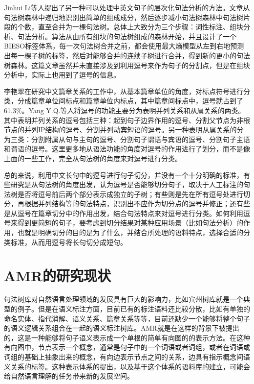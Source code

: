 \documentclass[master, winfont]{njuthesis}
\begin{document}
Jinhui Li等人\cite{Li2008}提出了另一种可以处理中英文句子的层次化句法分析的方法。文章从句法树森林中递归地识别出简单的组成成分，然后逐步减小句法树森林中句法树片段的个数，直至合并为一棵句法树。总体上大致分为三个步骤：词性标注、组块分析、句法分析。算法从由所有组块的句法树组成的森林开始，并且设计了一个BIESO标签体系，每一次句法树合并之前，都会使用最大熵模型从左到右地预测出每一棵子树的标签，然后对能够合并的连续子树进行合并，得到新的更小的句法树森林。这篇文章虽然并未直接涉及到利用逗号来作为句子的分割点，但是在组块分析中，实际上也用到了逗号的信息。

李艳翠\cite{liyancui2015}在研究中文篇章关系的工作中，从基本篇章单位的角度，对标点符号进行分类，分成篇章单位间标点和篇章单位内标点，其中篇章间标点中，逗号就占到了61.3\%。Yang Y.Q.等人\cite{Yang2012Chinese}将逗号的功能主要分为表明并列关系和从属关系的两类。其中表明并列关系的逗号包括三种：起到句子边界作用的逗号、分割父节点为非根节点的并列IP结构的逗号、分割并列动宾短语的逗号。另一种表明从属关系的分为三类：分割附属从句与主句的逗号、分割句子谓语与宾语的逗号、分割句子主语和谓语的逗号。这里更多地从语法功能的角度对逗号的作用进行了划分，而不是像上面的一些工作，完全从句法树的角度来对逗号进行分类。

总的来说，利用中文长句中的逗号进行句子切分，并没有一个十分明确的标准，有些研究是从句法树的角度出发，认为逗号是否能够切分句子，取决于人工标注的句法树是否将逗号前后两个部分表示成独立的子树；有些则是先在所有逗号处进行切分，再根据并列结构等的句法特点，识别出不应作为切分点的逗号并修正；还有些是从逗号在篇章切分中的作用出发，结合句法特点来对逗号进行分类。如何利用逗号来得到更简短的句子，要考虑到切分结果对某种应用场景（比如句法分析）的作用，也就是明确切分的目的是为了什么，并结合所处理的语料特点，选择合适的分类标准，从而用逗号将长句切分成短句。

\section{AMR的研究现状}
句法树库对自然语言处理领域的发展具有巨大的影响力，比如宾州树库就是一个典型的例子。但是在语义标注方面，目前已有的标注语料还比较分散，比如有单独的命名实体、指代消解、语义关系、篇章关系等等，目前还缺少一个能够将整个句子的语义逻辑关系组合在一起的语义标注树库。AMR就是在这样的背景下被提出的，这是一种能够将句子语义表示成一个单根的简单有向图的的表示方法。在这种有向图中，节点表示一个概念，通常是句子中的一个词语或者词组，或者在词语或词组的基础上抽象出来的概念，有向边表示节点之间的关系，边具有指示概念间语义关系的标签。这种表示体系的提出，以及基于这个体系的语料库的建立，可能会给自然语言理解的任务带来新的发展空间。
\end{document}
